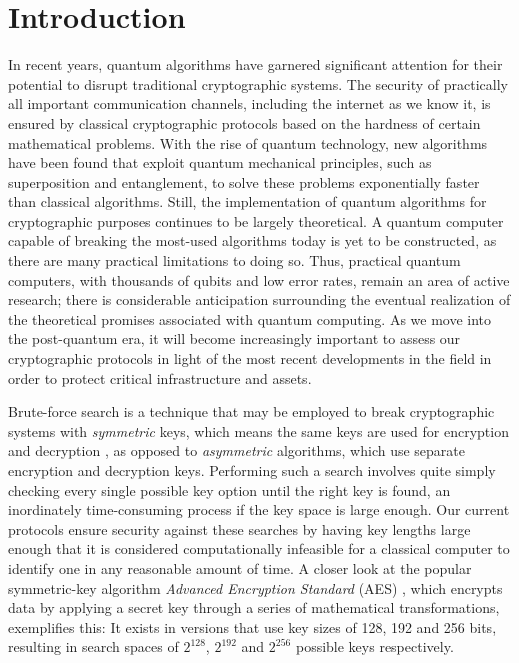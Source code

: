 \chapter{Introduction}
In recent years, quantum algorithms have garnered significant attention for their potential to disrupt traditional cryptographic systems. The security of practically all important communication channels, including the internet as we know it, is ensured by classical cryptographic protocols based on the hardness of certain mathematical problems. With the rise of quantum technology, new algorithms have been found that exploit quantum mechanical principles, such as superposition and entanglement, to solve these problems exponentially faster than classical algorithms. Still, the implementation of quantum algorithms for cryptographic purposes continues to be largely theoretical. A quantum computer capable of breaking the most-used algorithms today is yet to be constructed, as there are many practical limitations to doing so. Thus, practical quantum computers, with thousands of qubits and low error rates, remain an area of active research; there is considerable anticipation surrounding the eventual realization of the theoretical promises associated with quantum computing. As we move into the post-quantum era, it will become increasingly important to assess our cryptographic protocols in light of the most recent developments in the field in order to protect critical infrastructure and assets.

Brute-force search is a technique that may be employed to break cryptographic systems with \emph{symmetric} keys, which means the same keys are used for encryption and decryption \cite{symmetric}, as opposed to \emph{asymmetric} algorithms, which use separate encryption and decryption keys. Performing such a search involves quite simply checking every single possible key option until the right key is found, an inordinately time-consuming process if the key space is large enough. Our current protocols ensure security against these searches by having key lengths large enough that it is considered computationally infeasible for a classical computer to identify one in any reasonable amount of time. A closer look at the popular symmetric-key algorithm \emph{Advanced Encryption Standard} (AES) \cite{aes}, which encrypts data by applying a secret key through a series of mathematical transformations, exemplifies this: It exists in versions that use key sizes of 128, 192 and 256 bits, resulting in search spaces of $2^{128}$, $2^{192}$ and $2^{256}$ possible keys respectively.

